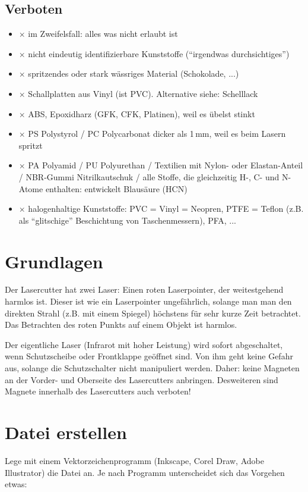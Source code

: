 \documentclass{\basedir/fablab-document}
\begin{document}
	\newpage %

	\subsection{Verboten}
	\newcommand{\itemCross}{\item[$\times$]}
	\begin{itemize}
		\itemCross im Zweifelsfall: alles was nicht erlaubt ist
		\itemCross nicht eindeutig identifizierbare Kunststoffe (\enquote{irgendwas durchsichtiges})
		\itemCross spritzendes oder stark wässriges Material (Schokolade, ...)
		\itemCross Schallplatten aus Vinyl (ist PVC). Alternative siehe: Schelllack
		\itemCross ABS, Epoxidharz (GFK, CFK, Platinen), weil es übelst stinkt
		\itemCross PS Polystyrol / PC Polycarbonat dicker als 1\,mm, weil es beim Lasern spritzt
		\itemCross PA Polyamid / PU Polyurethan / Textilien mit Nylon- oder Elastan-Anteil / NBR-Gummi Nitrilkautschuk / alle Stoffe, die gleichzeitig H-, C- und N-Atome enthalten: entwickelt Blausäure (HCN)
		\itemCross halogenhaltige Kunststoffe: PVC = Vinyl = Neopren, PTFE = Teflon (z.B. als \enquote{glitschige} Beschichtung von Taschenmessern), PFA, ...
	\end{itemize}

	\section{Grundlagen}
	Der Lasercutter hat zwei Laser: Einen roten Laserpointer, der weitestgehend harmlos ist. Dieser ist wie ein Laserpointer ungefährlich, solange man man den direkten Strahl (z.B. mit einem Spiegel) höchstens für sehr kurze Zeit betrachtet. Das Betrachten des roten Punkts auf einem Objekt ist harmlos.

	Der eigentliche Laser (Infrarot mit hoher Leistung) wird sofort abgeschaltet, wenn Schutzscheibe oder Frontklappe geöffnet sind. Von ihm geht keine Gefahr aus, solange die Schutzschalter nicht manipuliert werden. Daher: keine Magneten an der Vorder- und Oberseite des Lasercutters anbringen. Desweiteren sind Magnete innerhalb des Lasercutters auch verboten!

	\section{Datei erstellen}
	Lege mit einem Vektorzeichenprogramm (Inkscape, Corel Draw, Adobe Illustrator) die Datei an. Je nach Programm unterscheidet sich das Vorgehen etwas:
\end{document}
